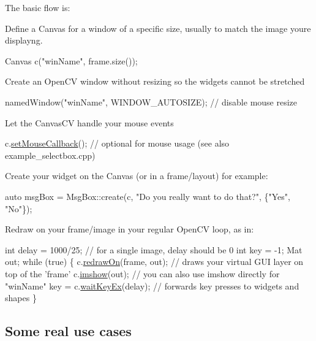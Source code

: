 The basic flow is\+:
\begin{DoxyItemize}
\item Define a Canvas for a window of a specific size, usually to match the image you\textquotesingle{}re displayng. 
\begin{DoxyCode}
Canvas c(\textcolor{stringliteral}{"winName"}, frame.size());
\end{DoxyCode}

\item Create an Open\+CV window without resizing so the widgets cannot be stretched 
\begin{DoxyCode}
namedWindow(\textcolor{stringliteral}{"winName"}, WINDOW\_AUTOSIZE); \textcolor{comment}{// disable mouse resize}
\end{DoxyCode}

\item Let the Canvas\+CV handle your mouse events 
\begin{DoxyCode}
c.\hyperlink{classcanvascv_1_1Canvas_acf6e5d4b40aec610b0dc8c4f6bf93ac1}{setMouseCallback}(); \textcolor{comment}{// optional for mouse usage (see also example\_selectbox.cpp)}
\end{DoxyCode}

\item Create your widget on the Canvas (or in a frame/layout) for example\+: 
\begin{DoxyCode}
\textcolor{keyword}{auto} msgBox = MsgBox::create(c, \textcolor{stringliteral}{"Do you really want to do that?"}, \{\textcolor{stringliteral}{"Yes"}, \textcolor{stringliteral}{"No"}\});
\end{DoxyCode}

\item Redraw on your frame/image in your regular Open\+CV loop, as in\+: 
\begin{DoxyCode}
\textcolor{keywordtype}{int} delay = 1000/25; \textcolor{comment}{// for a single image, delay should be 0}
\textcolor{keywordtype}{int} key = -1;
Mat out;
\textcolor{keywordflow}{while} (\textcolor{keyword}{true})
\{
    c.\hyperlink{classcanvascv_1_1Canvas_a018c66e277de7904b8146ea3f3feebdd}{redrawOn}(frame, out);   \textcolor{comment}{// draws your virtual GUI layer on top of the 'frame'}
    c.\hyperlink{classcanvascv_1_1Canvas_acaf9494a5668046dd0a8908aa97a7a43}{imshow}(out);            \textcolor{comment}{// you can also use imshow directly for "winName"}
    key = c.\hyperlink{classcanvascv_1_1Canvas_a59397db05f5d9e45264f626f6a2ae528}{waitKeyEx}(delay); \textcolor{comment}{// forwards key presses to widgets and shapes}
\}
\end{DoxyCode}

\end{DoxyItemize}\hypertarget{tutscreentext_screentext_s2}{}\subsection{Some real use cases}\label{tutscreentext_screentext_s2}
